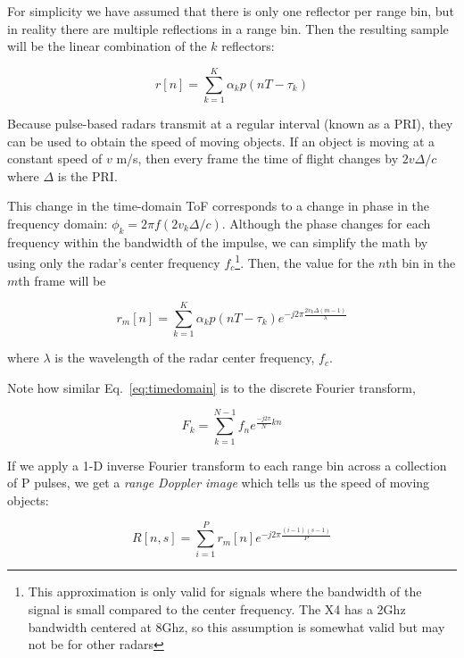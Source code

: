 \documentclass[12pt]{article}
\begin{document}
For simplicity we have assumed that there is only one reflector per
range bin, but in reality there are multiple reflections in a range
bin. Then the resulting sample will be the linear combination of the
$k$ reflectors:

\begin{equation}
r[n] = \sum\limits_{k=1}^K \alpha_k p(nT - \tau_k)  
\end{equation}

Because pulse-based radars transmit at a regular interval (known as a
PRI), they can be used to obtain the speed of moving objects. If an
object is moving at a constant speed of $v$ m/s, then every frame the
time of flight changes by $2v\Delta/c$ where $\Delta$ is the PRI.

This change in the time-domain ToF corresponds to a change in phase in
the frequency domain: $\phi_k = 2\pi f (2v_k\Delta/c)$. Although the phase
changes for each frequency within the bandwidth of the impulse, we can
simplify the math by using only the radar's center frequency
$f_c$\footnote{This approximation is only valid for signals where the
  bandwidth of the signal is small compared to the center
  frequency. The X4 has a 2Ghz bandwidth centered at 8Ghz, so this
  assumption is somewhat valid but may not be for other radars}. Then,
the value for the $n$th bin in the $m$th frame will be


\begin{equation}
r_m[n] =  \sum\limits_{k=1}^K \alpha_k p(nT - \tau_k)e^{-j2\pi  \frac{2 v_k \Delta(m-1)}{\lambda}}  
\label{eq:timedomain}
\end{equation}

where $\lambda$ is the wavelength of the radar center frequency,
$f_c$.

Note how similar Eq.~\ref{eq:timedomain} is to the discrete Fourier transform,

\begin{equation}
F_k = \sum\limits_{k=1}^{N-1} f_n e^{\frac{-j2\pi}{N}kn}
\end{equation}

If we apply a 1-D inverse Fourier transform to each range bin across a
collection of P pulses, we get a \emph{range Doppler image} which
tells us the speed of moving objects:

\begin{equation}
R[n,s] = \sum\limits_{i=1}^{P} r_m[n] e^{-j2\pi\frac{(i-1)(s-1)}{P}}
\label{eq:rangedopp}
\end{equation}
\end{document}
